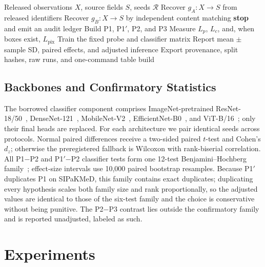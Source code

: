 \documentclass[conference]{IEEEtran}
\newcommand{\protocol}[1]{\textsf{#1}}
\begin{document}
\begin{algorithm}[t]
\caption{Fail-closed provenance-aware evaluation}
\label{alg:cytofair}
\begin{algorithmic}[1]
\Require Released observations $X$, source fields $S$, seeds $\mathcal{R}$
\State Recover $g_A:X\!\to\!S$ from released identifiers
\State Recover $g_B:X\!\to\!S$ by independent content matching
    \State \textbf{stop} and emit an audit ledger
\EndIf
{}
    \State Build \protocol{P1}, \protocol{P1$'$}, \protocol{P2}, and \protocol{P3}
    \State Measure $L_p$, $L_c$, and, when boxes exist, $L_{\mathrm{pix}}$
    \State Train the fixed probe and classifier matrix
\EndFor
\State Report mean $\pm$ sample SD, paired effects, and adjusted inference
\State Export provenance, split hashes, raw runs, and one-command table build
\end{algorithmic}
\end{algorithm}

\subsection{Backbones and Confirmatory Statistics}
The borrowed classifier component comprises ImageNet-pretrained ResNet-18/50~\cite{he2016resnet}, DenseNet-121~\cite{huang2017densenet}, MobileNet-V2~\cite{sandler2018mobilenetv2}, EfficientNet-B0~\cite{tan2019efficientnet}, and ViT-B/16~\cite{dosovitskiy2021vit}; only their final heads are replaced.
For each architecture we pair identical seeds across protocols.
Normal paired differences receive a two-sided paired $t$-test and Cohen's $d_z$; otherwise the preregistered fallback is Wilcoxon with rank-biserial correlation.
All \protocol{P1}$-$\protocol{P2} and \protocol{P1$'$}$-$\protocol{P2} classifier tests form one 12-test Benjamini--Hochberg family~\cite{benjamini1995fdr}; effect-size intervals use 10,000 paired bootstrap resamples.
Because \protocol{P1$'$} duplicates \protocol{P1} on SIPaKMeD, this family contains exact duplicates; duplicating every hypothesis scales both family size and rank proportionally, so the adjusted values are identical to those of the six-test family and the choice is conservative without being punitive.
The \protocol{P2}$-$\protocol{P3} contrast lies outside the confirmatory family and is reported unadjusted, labeled as such.

\section{Experiments}
\end{document}
